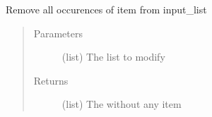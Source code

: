 \documentclass[a4paper,10pt,english]{sphinxmanual}
\begin{document}

\begin{fulllineitems}
\label{\detokenize{apidoc_src/src:src.utilsSat.read_config_from_a_file}}
\end{fulllineitems}


\begin{fulllineitems}
\label{\detokenize{apidoc_src/src:src.utilsSat.red}}
\end{fulllineitems}


\begin{fulllineitems}
\label{\detokenize{apidoc_src/src:src.utilsSat.remove_item_from_list}}
Remove all occurences of item from input\_list
\begin{quote}\begin{description}
\item[{Parameters}] \leavevmode
{} \textendash{} (list) The list to modify

\item[{Returns}] \leavevmode
(list) The without any item

\end{description}\end{quote}

\end{fulllineitems}

\end{document}
